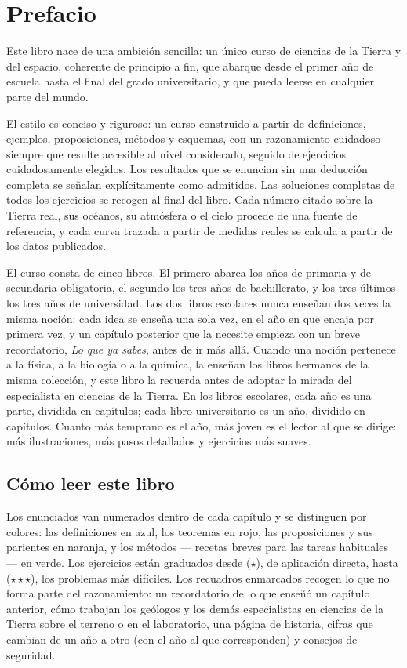 \chapter{Prefacio}

Este libro nace de una ambición sencilla: un único curso de ciencias de la
Tierra y del espacio, coherente de principio a fin, que abarque desde el
primer año de escuela hasta el final del grado universitario, y que pueda
leerse en cualquier parte del mundo.

El estilo es conciso y riguroso: un curso construido a partir de
definiciones, ejemplos, proposiciones, métodos y esquemas, con un
razonamiento cuidadoso siempre que resulte accesible al nivel
considerado, seguido de ejercicios cuidadosamente elegidos. Los
resultados que se enuncian sin una deducción completa se señalan
explícitamente como admitidos. Las soluciones completas de todos los
ejercicios se recogen al final del libro. Cada número citado sobre la
Tierra real, sus océanos, su atmósfera o el cielo procede de una fuente de
referencia, y cada curva trazada a partir de medidas reales se calcula a
partir de los datos publicados.

El curso consta de cinco libros. El primero abarca los años de primaria y
de secundaria obligatoria, el segundo los tres años de bachillerato, y los
tres últimos los tres años de universidad. Los dos libros escolares nunca
enseñan dos veces la misma noción: cada idea se enseña una sola vez, en el
año en que encaja por primera vez, y un capítulo posterior que la necesite
empieza con un breve recordatorio, \emph{Lo que ya sabes}, antes de ir más
allá. Cuando una noción pertenece a la física, a la biología o a la
química, la enseñan los libros hermanos de la misma colección, y este libro
la recuerda antes de adoptar la mirada del especialista en ciencias de la
Tierra. En los libros escolares, cada año es una parte, dividida en
capítulos; cada libro universitario es un año, dividido en capítulos.
Cuanto más temprano es el año, más joven es el lector al que se dirige:
más ilustraciones, más pasos detallados y ejercicios más suaves.

\section*{Cómo leer este libro}

Los enunciados van numerados dentro de cada capítulo y se distinguen por
colores: las definiciones en azul, los teoremas en rojo, las
proposiciones y sus parientes en naranja, y los métodos --- recetas
breves para las tareas habituales --- en verde. Los ejercicios están
graduados desde ($\star$), de aplicación directa, hasta
($\star\star\star$), los problemas más difíciles. Los recuadros
enmarcados recogen lo que no forma parte del razonamiento: un
recordatorio de lo que enseñó un capítulo anterior, cómo trabajan los
geólogos y los demás especialistas en ciencias de la Tierra sobre el
terreno o en el laboratorio, una página de historia, cifras que cambian de
un año a otro (con el año al que corresponden) y consejos de seguridad.

